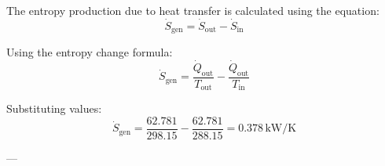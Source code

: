 The entropy production due to heat transfer is calculated using the equation:  
\[
\dot{S}_{\text{gen}} = \dot{S}_{\text{out}} - \dot{S}_{\text{in}}
\]  

Using the entropy change formula:  
\[
\dot{S}_{\text{gen}} = \frac{\dot{Q}_{\text{out}}}{T_{\text{out}}} - \frac{\dot{Q}_{\text{out}}}{T_{\text{in}}}
\]  

Substituting values:  
\[
\dot{S}_{\text{gen}} = \frac{62.781}{298.15} - \frac{62.781}{288.15} = 0.378 \, \text{kW/K}
\]  

---